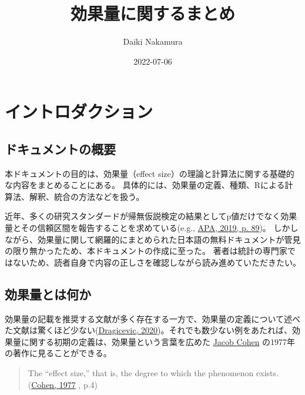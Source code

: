 \documentclass[
  ja=standard, xelatex, base=12pt]{bxjsreport}
\title{効果量に関するまとめ}
\author{Daiki Nakamura}
\date{2022-07-06}
\begin{document}
\maketitle

{
\setcounter{tocdepth}{1}
\tableofcontents
}
\hypertarget{ux30a4ux30f3ux30c8ux30edux30c0ux30afux30b7ux30e7ux30f3}{%
\chapter{イントロダクション}\label{ux30a4ux30f3ux30c8ux30edux30c0ux30afux30b7ux30e7ux30f3}}

\hypertarget{ux30c9ux30adux30e5ux30e1ux30f3ux30c8ux306eux6982ux8981}{%
\section{ドキュメントの概要}\label{ux30c9ux30adux30e5ux30e1ux30f3ux30c8ux306eux6982ux8981}}

本ドキュメントの目的は、効果量（effect size）の理論と計算法に関する基礎的な内容をまとめることにある。 具体的には、効果量の定義、種類、Rによる計算法、解釈、統合の方法などを扱う。

近年、多くの研究スタンダードが帰無仮説検定の結果としてp値だけでなく効果量とその信頼区間を報告することを求めている(e.g., \protect\hyperlink{ref-american2019publication}{APA, 2019, p. 89})。 しかしながら、効果量に関して網羅的にまとめられた日本語の無料ドキュメントが管見の限り無かったため、本ドキュメントの作成に至った。 著者は統計の専門家ではないため、読者自身で内容の正しさを確認しながら読み進めていただきたい。

\hypertarget{ux52b9ux679cux91cfux3068ux306fux4f55ux304b}{%
\section{効果量とは何か}\label{ux52b9ux679cux91cfux3068ux306fux4f55ux304b}}

効果量の記載を推奨する文献が多く存在する一方で、効果量の定義について述べた文献は驚くほど少ない(\protect\hyperlink{ref-dragicevic2020mean}{Dragicevic, 2020})。それでも数少ない例をあたれば、効果量に関する初期の定義は、効果量という言葉を広めた \href{https://en.wikipedia.org/wiki/Jacob_Cohen_(statistician)}{Jacob Cohen} の1977年の著作に見ることができる。

\begin{quote}
The ``effect size,'' that is, the degree to which the phenomenon exists. (\protect\hyperlink{ref-cohen1977statistical}{Cohen, 1977} , p.4)
\end{quote}
\end{document}
